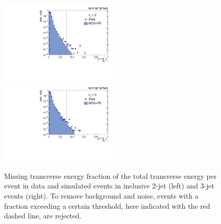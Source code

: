 \begin{figure}[!htbp]
\centering
 \includegraphics[width=0.51\textwidth]{Plots_HT_2_150/Missing_ET_2.pdf}%
 ~~\includegraphics[width=0.51\textwidth]{Plots_HT_2_150/Missing_ET_3.pdf}
 \caption{Missing transverse energy fraction of the total transverse energy per event in data and simulated events in inclusive 2-jet (left) and 3-jet events (right). To remove background and noise, events with a fraction exceeding a certain threshold, here indicated with the red dashed line, are rejected.}
 \label{fig:metcut}
\end{figure} 

